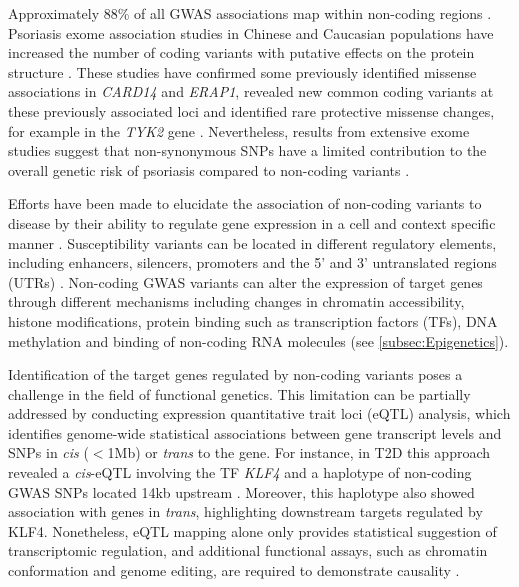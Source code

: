 Approximately 88\% of all GWAS associations map within non-coding regions \parencite{Welter2013}. Psoriasis exome association studies in Chinese and Caucasian populations have increased the number of coding variants with putative effects on the protein structure \parencite{Tang2014, Zuo2015, Dand2017}. These studies have confirmed some previously identified missense associations in \textit{CARD14} and \textit{ERAP1}, revealed new common coding variants at these previously associated loci and identified rare protective missense changes, for example in the \textit{TYK2} gene \parencite{Tang2014,Dand2017}. Nevertheless, results from extensive exome studies suggest that non-synonymous SNPs have a limited contribution to the overall genetic risk of psoriasis compared to non-coding variants \parencite{Tang2014}.

Efforts have been made to elucidate the association of non-coding variants to disease by their ability to regulate gene expression in a cell and context specific manner  \parencite{Fairfax2012, Fairfax2012, Naranbhai2015,Nica2011}. Susceptibility variants can be located in different regulatory elements, including enhancers, silencers, promoters and the 5' and 3' untranslated regions (UTRs)  \parencite{Ward2012}. Non-coding GWAS variants can alter the expression of target genes through different mechanisms including changes in chromatin accessibility, histone modifications, protein binding such as transcription factors (TFs), DNA methylation and binding of non-coding RNA molecules \parencite{Knight2014} (see \ref{subsec:Epigenetics}).

Identification of the target genes regulated by non-coding variants poses a challenge in the field of functional genetics. This limitation can be partially addressed by conducting expression quantitative trait loci (eQTL) analysis, which identifies genome-wide statistical associations between gene transcript levels and SNPs in \textit{cis} ($<$1Mb) or \textit{trans} to the gene. For instance, in T2D this approach revealed a \textit{cis}-eQTL involving the TF \textit{KLF4} and a haplotype of non-coding GWAS SNPs located 14kb upstream \parencite{Small2011}. Moreover, this haplotype also showed association with genes in \textit{trans}, highlighting downstream targets regulated by KLF4. Nonetheless, eQTL mapping alone only provides statistical suggestion of transcriptomic regulation, and additional functional assays, such as chromatin conformation and genome editing, are required to demonstrate causality \parencite{Edwards2013}.  
 


